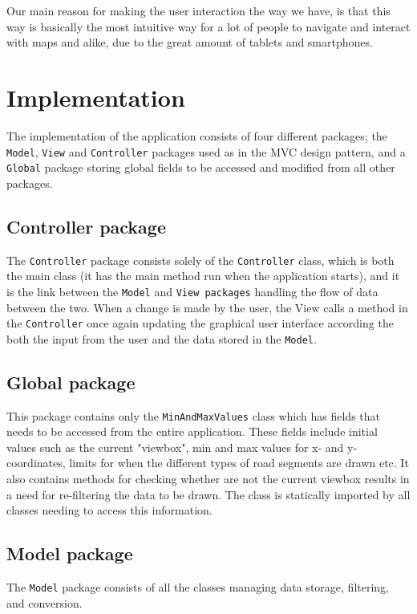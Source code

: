 \documentclass[a4paper,11pt]{article}
\begin{document}
Our main reason for making the user interaction the way we have, is that this way is basically the most intuitive way for a lot of people to navigate and interact with maps and alike, due to the great amount of tablets and smartphones.

\pagebreak
\section{Implementation} %
\label{sec:Implementation} %
The implementation of the application consists of four different packages; the \texttt{Model}, \texttt{View} and \texttt{Controller} packages used as in the MVC design pattern, and a \texttt{Global} package storing global fields to be accessed and modified from all other packages.


\subsection{Controller package} %
The \texttt{Controller} package consists solely of the \texttt{Controller} class, which is both the main class (it has the main method run when the application starts), and it is the link between the \texttt{Model} and \texttt{View packages} handling the flow of data between the two. When a change is made by the user, the View calls a method in the \texttt{Controller} once again updating the graphical user interface according the both the input from the user and the data stored in the \texttt{Model}.

\subsection{Global package} %
This package contains only the \texttt{MinAndMaxValues} class which has fields that needs to be accessed from the entire application. These fields include initial values such as the current "viewbox", min and max values for x- and y-coordinates, limits for when the different types of road segments are drawn etc. It also contains methods for checking whether are not the current viewbox results in a need for re-filtering the data to be drawn. The class is statically imported by all classes needing to access this information.

\subsection{Model package} %
The \texttt{Model} package consists of all the classes managing data storage, filtering, and conversion.
\end{document}
